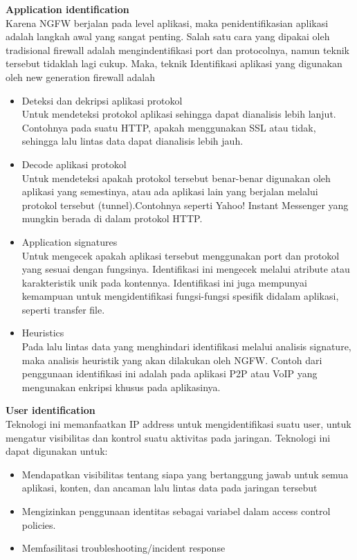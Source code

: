 \noindent\textbf{Application identification}\\
Karena NGFW berjalan pada level aplikasi, maka penidentifikasian aplikasi adalah langkah awal yang sangat penting. Salah satu cara yang dipakai oleh tradisional firewall adalah mengindentifikasi port dan protocolnya, namun teknik tersebut tidaklah lagi cukup. Maka, teknik Identifikasi aplikasi yang digunakan oleh new generation firewall adalah 
\begin{itemize}
	\item Deteksi dan dekripsi aplikasi protokol\\
	Untuk mendeteksi protokol aplikasi sehingga dapat dianalisis lebih lanjut. Contohnya pada suatu HTTP, apakah menggunakan SSL atau tidak, sehingga lalu lintas data dapat dianalisis lebih jauh. 
	\item Decode aplikasi protokol\\
	Untuk mendeteksi apakah protokol tersebut benar-benar digunakan oleh aplikasi yang semestinya, atau  ada aplikasi lain yang berjalan melalui protokol tersebut (tunnel).Contohnya seperti Yahoo! Instant Messenger yang mungkin berada di dalam protokol HTTP.
	\item Application signatures\\
	Untuk mengecek apakah aplikasi tersebut menggunakan port dan protokol
	yang sesuai dengan fungsinya. Identifikasi ini mengecek melalui atribute atau karakteristik unik pada kontennya. Identifikasi ini juga mempunyai kemampuan untuk mengidentifikasi fungsi-fungsi spesifik didalam aplikasi, seperti transfer file.
	\item Heuristics\\
	Pada lalu lintas data yang menghindari identifikasi melalui analisis signature, maka analisis heuristik yang akan dilakukan oleh NGFW. Contoh dari penggunaan identifikasi ini adalah pada aplikasi P2P atau VoIP yang mengunakan enkripsi khusus pada aplikasinya. 
\end{itemize}

\noindent\textbf{User identification}\\
Teknologi ini memanfaatkan IP address untuk mengidentifikasi suatu user, untuk mengatur visibilitas dan kontrol suatu aktivitas pada jaringan. Teknologi ini dapat digunakan untuk:
\begin{itemize}
	\item Mendapatkan visibilitas tentang siapa yang bertanggung jawab untuk semua aplikasi, konten, dan ancaman lalu lintas data pada jaringan tersebut
	\item Mengizinkan penggunaan identitas sebagai variabel dalam access control policies.
	\item Memfasilitasi troubleshooting/incident response
\end{itemize}

